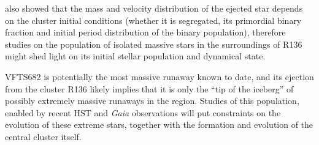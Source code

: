 \documentclass[apjl,twocolumn]{emulateapj}
\begin{document}
\citet{oh:16} also showed that the mass and velocity distribution of the ejected star depends on the cluster initial conditions
(whether it is segregated, its primordial binary fraction and initial period
distribution of the binary population), therefore studies on
the population of isolated massive stars in the surroundings of R136
might shed light on its initial stellar population and dynamical
state. 

VFTS682 is potentially the most massive runaway known to date, and its ejection
from the cluster R136 likely implies that it is only the ``tip of the
iceberg'' of possibly extremely massive runaways in the
region. Studies of this population, enabled by recent HST and \emph{Gaia} observations will put constraints on the evolution
of these extreme stars, together with the formation and evolution of
the central cluster itself.



 
 
\end{document}
